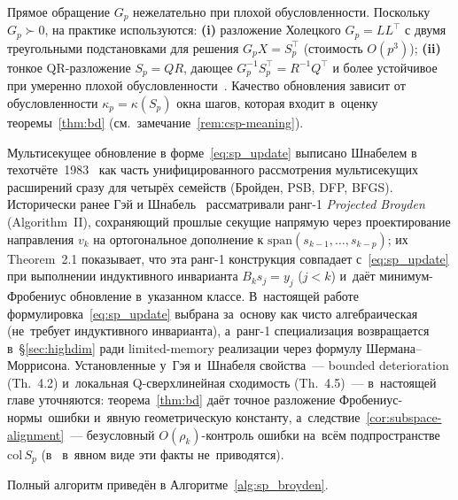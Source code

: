 \begin{remark}\label{rem:ms_numerical}
Прямое обращение $G_p$ нежелательно при плохой обусловленности.
Поскольку $G_p \succ 0$, на практике используются:
\textbf{(i)} разложение Холецкого $G_p = LL^\top$ с двумя треугольными
подстановками для решения $G_p X = S_p^\top$ (стоимость $O(p^3)$);
\textbf{(ii)} тонкое QR-разложение $S_p = QR$, дающее
$G_p^{-1} S_p^\top = R^{-1} Q^\top$ и более устойчивое при умеренно
плохой обусловленности~\cite[\S 5.3.3]{golub2013}. Качество обновления
зависит от обусловленности $\kappa_p = \kappa(S_p)$ окна шагов, которая
входит в~оценку теоремы~\ref{thm:bd} (см.\ замечание~\ref{rem:csp-meaning}).
\end{remark}

\begin{remark}\label{rem:ms_history}
Мультисекущее обновление в форме~\eqref{eq:sp_update} выписано Шнабелем
в техотчёте~1983~\cite{schnabel1983} как часть унифицированного
рассмотрения мультисекущих расширений сразу для четырёх семейств
(Бройден, PSB, DFP, BFGS). Исторически ранее Гэй и
Шнабель~\cite{gay_schnabel1978} рассматривали ранг-1 \emph{Projected
Broyden} (Algorithm~II), сохраняющий прошлые секущие напрямую через
проектирование направления $v_k$ на ортогональное дополнение к
$\mathrm{span}(s_{k-1},\ldots,s_{k-p})$; их Theorem~2.1 показывает, что
эта ранг-1 конструкция совпадает с~\eqref{eq:sp_update} при выполнении
индуктивного инварианта $B_k s_j = y_j$ ($j<k$) и~даёт минимум-Фробениус
обновление в~указанном классе. В~настоящей работе формулировка~\eqref{eq:sp_update}
выбрана за~основу как чисто алгебраическая (не~требует индуктивного
инварианта), а~ранг-1 специализация возвращается в~\S\ref{sec:highdim}
ради limited-memory реализации через формулу
Шермана--Моррисона. Установленные у~Гэя и~Шнабеля свойства~--- bounded
deterioration (Th.~4.2) и~локальная Q-сверхлинейная сходимость
(Th.~4.5)~--- в~настоящей главе уточняются: теорема~\ref{thm:bd} даёт
точное разложение Фробениус-нормы~ошибки и~явную геометрическую
константу, а~следствие~\ref{cor:subspace-alignment}~--- безусловный
$O(\rho_k)$-контроль ошибки на~всём подпространстве $\mathrm{col}\,S_p$
(в~\cite{gay_schnabel1978} в~явном виде эти факты не~приводятся).
\end{remark}

\medskip

Полный алгоритм приведён в Алгоритме~\ref{alg:sp_broyden}.

